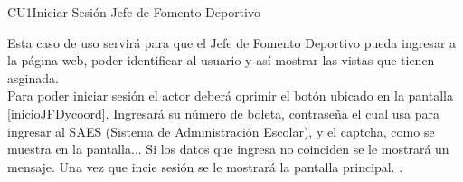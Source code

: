 \begin{UseCase}{CU1}{Iniciar Sesión Jefe de Fomento Deportivo}{
		\noindent Esta caso de uso servirá para que el Jefe de Fomento Deportivo pueda ingresar a la página web, poder identificar al usuario y así mostrar las vistas que tienen asginada. \\
    	Para poder iniciar sesión el actor deberá oprimir el botón  ubicado en la pantalla \ref{inicioJFDycoord}. Ingresará su número de boleta, contraseña el cual usa para ingresar al SAES (Sistema de Administración Escolar), y el captcha, como se muestra en la pantalla... Si los datos que ingresa no coinciden se le mostrará un mensaje.
        Una vez que incie sesión se le mostrará la pantalla principal.
        .
        
	} \label{CU1_Iniciarsesion}
		\end{UseCase}
	\newpage
	
